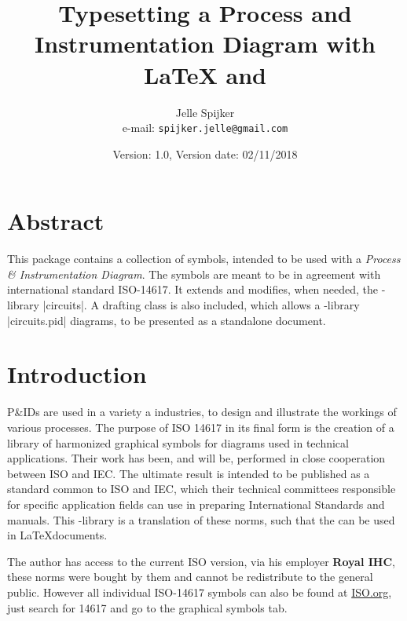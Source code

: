 \documentclass[a4paper]{ltxdoc}
\begin{document}
\title{Typesetting a Process and Instrumentation Diagram with \LaTeX{} and \tikzname{}}
\author{Jelle Spijker\\e-mail: \texttt{spijker.jelle@gmail.com}}
\date{Version: 1.0, Version date: 02/11/2018}

\maketitle

\section{Abstract}
This package contains a collection of symbols, intended to be used with a \emph{Process \& Instrumentation Diagram}. The symbols are meant to be in agreement with international standard ISO-14617. It extends and modifies, when needed, the \tikzname-library |circuits|. A drafting class is also included, which allows a \tikzname-library |circuits.pid| diagrams, to be presented as a standalone document.


\section{Introduction}
P\&IDs are used in a variety a industries, to design and illustrate the workings of various processes. The purpose of ISO 14617 in its final form is the creation of a library of harmonized graphical symbols for diagrams used in technical applications. Their work has been, and will be, performed in close cooperation between ISO and IEC. The ultimate result is intended to be published as a standard common to ISO and IEC, which their technical committees responsible for specific application fields can use in preparing International Standards and manuals. This \tikzname-library is a translation of these norms, such that the can be used in \LaTeX documents.

The author has access to the current ISO version, via his employer \textbf{Royal IHC}, these norms were bought by them and cannot be redistribute to the general public. However all individual ISO-14617 symbols can also be found at \href{https://www.iso.org/obp/ui#search}{ISO.org}, just search for 14617 and go to the graphical symbols tab.
\end{document}
